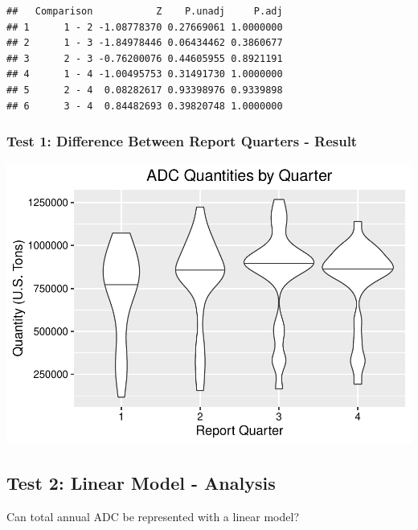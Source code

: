 \documentclass[12pt,]{article}
\begin{document}
\begin{verbatim}
##   Comparison           Z    P.unadj     P.adj
## 1      1 - 2 -1.08778370 0.27669061 1.0000000
## 2      1 - 3 -1.84978446 0.06434462 0.3860677
## 3      2 - 3 -0.76200076 0.44605955 0.8921191
## 4      1 - 4 -1.00495753 0.31491730 1.0000000
## 5      2 - 4  0.08282617 0.93398976 0.9339898
## 6      3 - 4  0.84482693 0.39820748 1.0000000
\end{verbatim}

\subsubsection{Test 1: Difference Between Report Quarters -
Result}\label{test-1-difference-between-report-quarters---result}

\includegraphics{SKo_Project_Template_files/figure-latex/Test1_2-1.pdf}

\subsection{Test 2: Linear Model -
Analysis}\label{test-2-linear-model---analysis}

Can total annual ADC be represented with a linear model?
\end{document}
